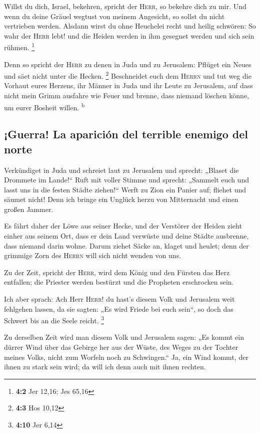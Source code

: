  Willst du dich, Israel, bekehren, spricht der
\textsc{Herr}, so bekehre dich zu mir. Und wenn du deine Gräuel wegtust
von meinem Angesicht, so sollst du nicht vertrieben werden.
 Alsdann wirst du ohne Heuchelei recht und heilig
schwören: So wahr der \textsc{Herr} lebt! und die Heiden werden in ihm
gesegnet werden und sich sein rühmen. \footnote{\textbf{4:2} Jer 12,16;
  Jes 65,16}

 Denn so spricht der \textsc{Herr} zu denen in Juda und zu
Jerusalem: Pflüget ein Neues und säet nicht unter die Hecken.
\footnote{\textbf{4:3} Hos 10,12}  Beschneidet euch dem
\textsc{Herrn} und tut weg die Vorhaut eures Herzens, ihr Männer in Juda
und ihr Leute zu Jerusalem, auf dass nicht mein Grimm ausfahre wie Feuer
und brenne, dass niemand löschen könne, um eurer Bosheit willen.
\textsuperscript{b}

\hypertarget{guerra-la-apariciuxf3n-del-terrible-enemigo-del-norte}{%
\subsection{¡Guerra! La aparición del terrible enemigo del
norte}\label{guerra-la-apariciuxf3n-del-terrible-enemigo-del-norte}}

 Verkündiget in Juda und schreiet laut zu Jerusalem und
sprecht: „Blaset die Drommete im Lande!{}`` Ruft mit voller Stimme und
sprecht: „Sammelt euch und lasst uns in die festen Städte ziehen!{}``
 Werft zu Zion ein Panier auf; fliehet und säumet nicht!
Denn ich bringe ein Unglück herzu von Mitternacht und einen großen
Jammer.

 Es fährt daher der Löwe aus seiner Hecke, und der
Verstörer der Heiden zieht einher aus seinem Ort, dass er dein Land
verwüste und deine Städte ausbrenne, dass niemand darin wohne.
 Darum ziehet Säcke an, klaget und heulet; denn der
grimmige Zorn des \textsc{Herrn} will sich nicht wenden von uns.

 Zu der Zeit, spricht der \textsc{Herr}, wird dem König
und den Fürsten das Herz entfallen; die Priester werden bestürzt und die
Propheten erschrocken sein.

 Ich aber sprach: Ach Herr \textsc{Herr}! du hast's
diesem Volk und Jerusalem weit fehlgehen lassen, da sie sagten: „Es wird
Friede bei euch sein``, so doch das Schwert bis an die Seele reicht.
\footnote{\textbf{4:10} Jer 6,14}

 Zu derselben Zeit wird man diesem Volk und Jerusalem
sagen: „Es kommt ein dürrer Wind über das Gebirge her aus der Wüste, des
Weges zu der Tochter meines Volks, nicht zum Worfeln noch zu
Schwingen.``  Ja, ein Wind kommt, der ihnen zu stark sein
wird; da will ich denn auch mit ihnen rechten.

